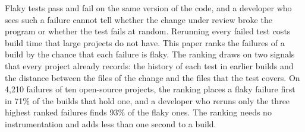 Flaky tests pass and fail on the same version of the code, and a developer who sees such a failure cannot tell
whether the change under review broke the program or whether the test fails at random. Rerunning every failed test
costs build time that large projects do not have. This paper ranks the failures of a build by the chance that each
failure is flaky. The ranking draws on two signals that every project already records: the history of each test in
earlier builds and the distance between the files of the change and the files that the test covers. On 4,210 failures
of ten open-source projects, the ranking places a flaky failure first in 71\% of the builds that hold one, and a
developer who reruns only the three highest ranked failures finds 93\% of the flaky ones. The ranking needs no
instrumentation and adds less than one second to a build.
